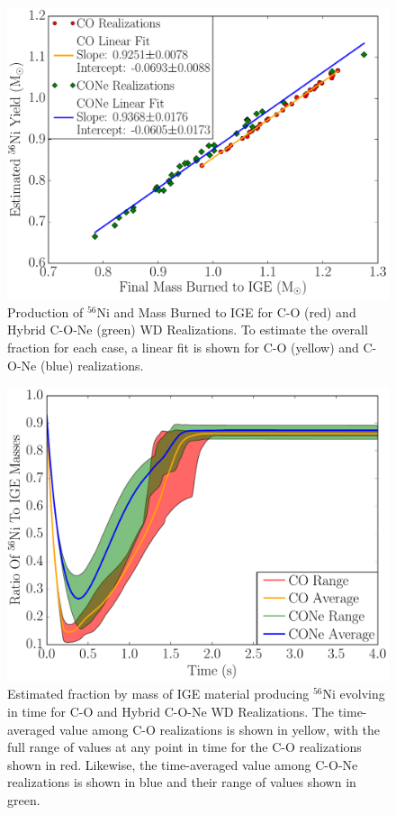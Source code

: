 \documentclass[iop,apj]{emulateapj}
\begin{document}
\begin{figure}[!ht]
	\includegraphics[width=\linewidth]{figures/compare/ni56_vs_nse_mass.pdf}
	\caption{\label{fig:ni56_vs_nse_mass} Production of $^{56}$Ni and Mass Burned to IGE for C-O (red) and Hybrid C-O-Ne (green) WD Realizations. To estimate the overall fraction for each case, a linear fit is shown for C-O (yellow) and C-O-Ne (blue) realizations.}
\end{figure}

\begin{figure}[!ht]
	\includegraphics[width=\linewidth]{figures/cf_shaded/ni56_nse_ratio.pdf}
	\caption{\label{fig:ni56_nse_mass_ratio} Estimated fraction by mass of IGE material producing $^{56}$Ni evolving in time for C-O and Hybrid C-O-Ne WD Realizations. The time-averaged value among C-O realizations is shown in yellow, with the full range of values at any point in time for the C-O realizations shown in red. Likewise, the time-averaged value among C-O-Ne realizations is shown in blue and their range of values shown in green.}
\end{figure}
\end{document}
